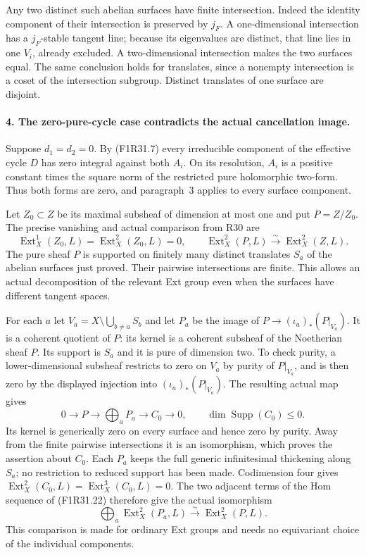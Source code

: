Any two distinct such abelian surfaces
have finite intersection. Indeed the
identity component of their intersection
is preserved by $j_F$. A one-dimensional
intersection has a $j_F$-stable tangent
line; because its eigenvalues are distinct,
that line lies in one $V_i$, already
excluded. A two-dimensional intersection
makes the two surfaces equal. The same
conclusion holds for translates, since a
nonempty intersection is a coset of the
intersection subgroup. Distinct translates
of one surface are disjoint.

\paragraph{4. The zero-pure-cycle case contradicts the actual cancellation image.}
Suppose $d_1=d_2=0$. By (F1R31.7) every
irreducible component of the effective
cycle $D$ has zero integral against
both $A_i$. On its resolution, $A_i$
is a positive constant times the square
norm of the restricted pure holomorphic
two-form. Thus both forms are zero,
and paragraph~3 applies to every
surface component.

Let $Z_0\subset Z$ be its maximal
subsheaf of dimension at most one and
put $P=Z/Z_0$. The precise vanishing
and actual comparison from R30 are
\[
 \operatorname{Ext}^1_X(Z_0,L)
  =\operatorname{Ext}^2_X(Z_0,L)=0,
 \qquad \operatorname{Ext}^2_X(P,L)
                   \xrightarrow{\sim}\operatorname{Ext}^2_X(Z,L).
 \tag{F1R31.21}
\]
The pure sheaf $P$ is supported on
finitely many distinct translates $S_a$
of the abelian surfaces just proved.
Their pairwise intersections are finite.
This allows an actual decomposition of
the relevant Ext group even when the
surfaces have different tangent spaces.

For each $a$ let
$V_a=X\setminus\bigcup_{b\ne a}S_b$ and
let $P_a$ be the image of
$P\to (\iota_a)_*(P|_{V_a})$.
It is a coherent quotient of $P$:
its kernel is a coherent subsheaf of
the Noetherian sheaf $P$. Its support
is $S_a$ and it is pure of dimension
two. To check purity, a lower-dimensional
subsheaf restricts to zero on $V_a$
by purity of $P|_{V_a}$, and is then
zero by the displayed injection into
$(\iota_a)_*(P|_{V_a})$.
The resulting actual map gives
\[
             0\longrightarrow P\longrightarrow
                    \bigoplus_a P_a\longrightarrow C_0
                           \longrightarrow0,
                    \qquad \dim\operatorname{Supp}(C_0)\le0.
 \tag{F1R31.22}
\]
Its kernel is generically zero on
every surface and hence zero by
purity. Away from the finite pairwise
intersections it is an isomorphism,
which proves the assertion about
$C_0$. Each $P_a$ keeps the full
generic infinitesimal thickening along
$S_a$; no restriction to reduced
support has been made.
Codimension four gives
$\operatorname{Ext}^2_X(C_0,L)=
\operatorname{Ext}^3_X(C_0,L)=0$.
The two adjacent terms of the Hom
sequence of (F1R31.22) therefore give
the actual isomorphism
\[
       \bigoplus_a\operatorname{Ext}^2_X(P_a,L)
                   \xrightarrow{\sim}\operatorname{Ext}^2_X(P,L).
 \tag{F1R31.23}
\]
This comparison is made for ordinary
Ext groups and needs no equivariant
choice of the individual components.


